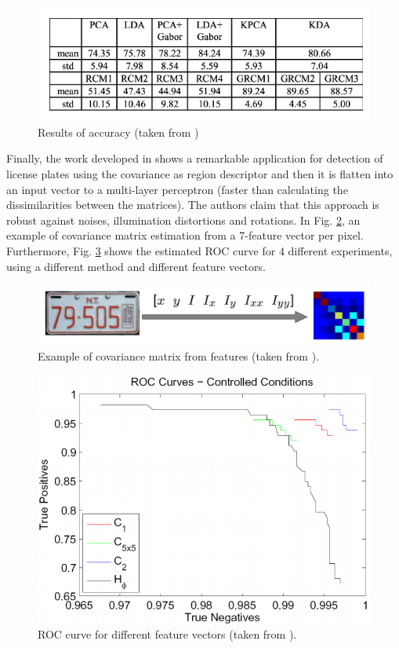 \documentclass[11pt]{article}
\theoremstyle{definition}
\theoremstyle{remark}
\theoremstyle{remark}
\theoremstyle{remark}
\begin{document}
\begin{figure}[H]
  \centering \includegraphics[scale = 0.45]{accuracy_comparing.png}
  \caption{Results of accuracy (taken from \cite{pang2008gabor})}
  \label{fig:accuracy}
\end{figure}

Finally, the work developed in \parencite{porikli2006robust} shows a remarkable
application for detection of license plates using the covariance as region
descriptor and then it is flatten into an input vector to a multi-layer
perceptron (faster than calculating the dissimilarities between the matrices).
The authors claim that this approach is robust against noises, illumination
distortions and rotations. In Fig. \ref{fig:plate}, an example of covariance
matrix estimation from a 7-feature vector per pixel. Furthermore, Fig.
\ref{fig:roc} shows the estimated ROC curve for 4 different experiments, using a
different method and different feature vectors.

\begin{figure}[H]
  \centering \includegraphics[scale=0.2]{plate.png}
  \caption{Example of covariance matrix from features (taken from
    \parencite{porikli2006robust}).}
  \label{fig:plate}
\end{figure}

\begin{figure}[H]
  \centering \includegraphics[scale=0.3]{roc.png}
  \caption{ROC curve for different feature vectors (taken from
    \parencite{porikli2006robust}).}
  \label{fig:roc}
\end{figure}
\end{document}
